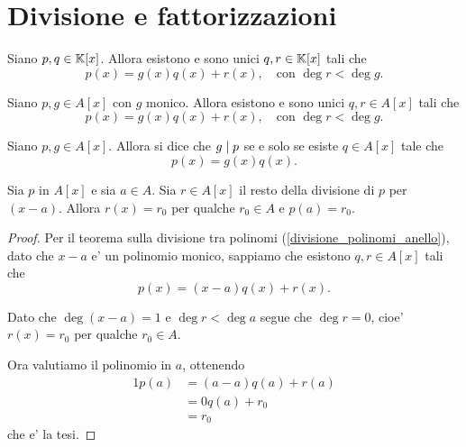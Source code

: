 \section{Divisione e fattorizzazioni}

\begin{theorem}
    Siano $p, q \in \mathbb{K}[x]$. Allora esistono e sono unici $q, r \in \mathbb{K}[x]$ tali che \begin{equation}
        p(x) = g(x)q(x) + r(x), \quad \text{con } \deg r < \deg g.
    \end{equation} 
\end{theorem}

\begin{proposition}\label{divisione_polinomi}
    Siano $p, g \in A[x]$ con $g$ monico. Allora esistono e sono unici $q, r \in A[x]$ tali che \begin{equation}
        p(x) = g(x)q(x) + r(x), \quad \text{con } \deg r < \deg g.
    \end{equation} 
\end{proposition}

\begin{definition}\label{divisione_polinomi_anello}
    Siano $p, g \in A[x]$. Allora si dice che $g \mid p$ se e solo se esiste $q \in A[x]$ tale che \[
        p(x) = g(x)q(x).    
    \]
\end{definition}

\begin{proposition}\label{resto_uguale_valutazione_nel_punto}
    Sia $p$ in $A[x]$ e sia $a \in A$. Sia $r \in A[x]$ il resto della divisione di $p$ per $(x-a)$. Allora $r(x) = r_0$ per qualche $r_0 \in A$ e $p(a) = r_0$.
\end{proposition}
\begin{proof}
    Per il teorema sulla divisione tra polinomi (\ref{divisione_polinomi_anello}), dato che $x-a$ e' un polinomio monico, sappiamo che esistono $q, r \in A[x]$ tali che \[
        p(x) = (x-a)q(x) + r(x).
    \]

    Dato che $\deg (x - a) = 1$ e $\deg r < \deg a$ segue che $\deg r = 0$, cioe' $r(x) = r_0$ per qualche $r_0 \in A$.

    Ora valutiamo il polinomio in $a$, ottenendo \begin{alignat*}
        {1}
        p(a) &= (a-a)q(a) + r(a)\\
        &= 0q(a) + r_0\\
        &= r_0
    \end{alignat*}
    che e' la tesi.
\end{proof}

